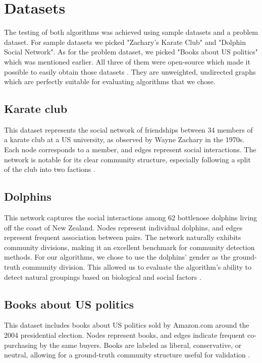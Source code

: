 \documentclass[conference]{IEEEtran}
\begin{document}
\section{Datasets}
The testing of both algorithms was achieved using sample datasets and a problem dataset. For sample datasets we picked "Zachary's Karate Club" and "Dolphin Social Network". As for the problem dataset, we picked "Books about US politics" which was mentioned earlier. All three of them were open-source which made it possible to easily obtain those datasets \cite{newman_netdata}. They are unweighted, undirected graphs which are perfectly suitable for evaluating algorithms that we chose.
\subsection{Karate club}
This dataset represents the social network of friendships between 34 members of a karate club at a US university, as observed by Wayne Zachary in the 1970s. Each node corresponds to a member, and edges represent social interactions. The network is notable for its clear community structure, especially following a split of the club into two factions \cite{newman_netdata}.
\subsection{Dolphins}
This network captures the social interactions among 62 bottlenose dolphins living off the coast of New Zealand. Nodes represent individual dolphins, and edges represent frequent association between pairs. The network naturally exhibits community divisions, making it an excellent benchmark for community detection methods. For our algorithms, we chose to use the dolphins’ gender as the ground-truth community division. This allowed us to evaluate the algorithm’s ability to detect natural groupings based on biological and social factors \cite{newman_netdata}.
\subsection{Books about US politics}
This dataset includes books about US politics sold by Amazon.com around the 2004 presidential election. Nodes represent books, and edges indicate frequent co-purchasing by the same buyers. Books are labeled as liberal, conservative, or neutral, allowing for a ground-truth community structure useful for validation \cite{newman_netdata}.
\end{document}
